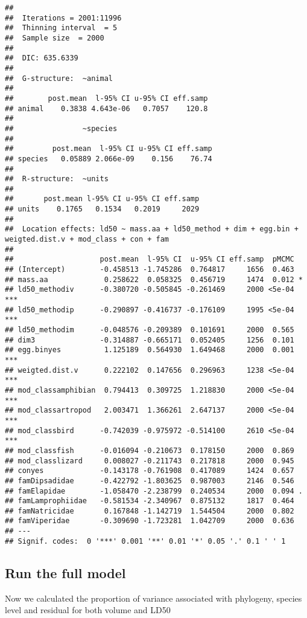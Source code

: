 \documentclass[]{article}
\begin{document}
\begin{verbatim}
## 
##  Iterations = 2001:11996
##  Thinning interval  = 5
##  Sample size  = 2000 
## 
##  DIC: 635.6339 
## 
##  G-structure:  ~animal
## 
##        post.mean  l-95% CI u-95% CI eff.samp
## animal    0.3838 4.643e-06   0.7057    120.8
## 
##                ~species
## 
##         post.mean  l-95% CI u-95% CI eff.samp
## species   0.05889 2.066e-09    0.156    76.74
## 
##  R-structure:  ~units
## 
##       post.mean l-95% CI u-95% CI eff.samp
## units    0.1765   0.1534   0.2019     2029
## 
##  Location effects: ld50 ~ mass.aa + ld50_method + dim + egg.bin + weigted.dist.v + mod_class + con + fam 
## 
##                    post.mean  l-95% CI  u-95% CI eff.samp  pMCMC    
## (Intercept)        -0.458513 -1.745286  0.764817     1656  0.463    
## mass.aa             0.258622  0.058325  0.456719     1474  0.012 *  
## ld50_methodiv      -0.380720 -0.505845 -0.261469     2000 <5e-04 ***
## ld50_methodip      -0.290897 -0.416737 -0.176109     1995 <5e-04 ***
## ld50_methodim      -0.048576 -0.209389  0.101691     2000  0.565    
## dim3               -0.314887 -0.665171  0.052405     1256  0.101    
## egg.binyes          1.125189  0.564930  1.649468     2000  0.001 ***
## weigted.dist.v      0.222102  0.147656  0.296963     1238 <5e-04 ***
## mod_classamphibian  0.794413  0.309725  1.218830     2000 <5e-04 ***
## mod_classartropod   2.003471  1.366261  2.647137     2000 <5e-04 ***
## mod_classbird      -0.742039 -0.975972 -0.514100     2610 <5e-04 ***
## mod_classfish      -0.016094 -0.210673  0.178150     2000  0.869    
## mod_classlizard     0.008027 -0.211743  0.217818     2000  0.945    
## conyes             -0.143178 -0.761908  0.417089     1424  0.657    
## famDipsadidae      -0.422792 -1.803625  0.987003     2146  0.546    
## famElapidae        -1.058470 -2.238799  0.240534     2000  0.094 .  
## famLamprophiidae   -0.581534 -2.340967  0.875132     1817  0.464    
## famNatricidae       0.167848 -1.142719  1.544504     2000  0.802    
## famViperidae       -0.309690 -1.723281  1.042709     2000  0.636    
## ---
## Signif. codes:  0 '***' 0.001 '**' 0.01 '*' 0.05 '.' 0.1 ' ' 1
\end{verbatim}

\subsection{Run the full model}\label{run-the-full-model-1}

Now we calculated the proportion of variance associated with phylogeny,
species level and residual for both volume and LD50
\end{document}
